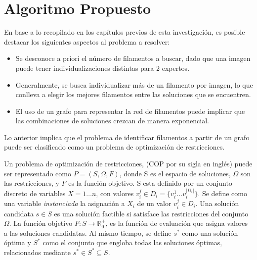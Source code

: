 \chapter{Algoritmo Propuesto}
\label{sec:modeloOpti}

En base a lo recopilado en los cap\'itulos previos de esta investigaci\'on, es posible destacar los siguientes aspectos al problema a resolver:

\begin{itemize}
    \item Se desconoce a priori el n\'umero de filamentos a buscar, dado que una imagen puede tener individualizaciones distintas para 2 expertos.
    \item Generalmente, se busca individualizar m\'as de un filamento por imagen, lo que conlleva a elegir los mejores filamentos entre las soluciones que se encuentren.
    \item El uso de un grafo para representar la red de filamentos puede implicar que las combinaciones de soluciones crezcan de manera exponencial.
\end{itemize}

Lo anterior implica que el problema de identificar filamentos a partir de un grafo puede ser clasificado como un problema de optimizaci\'on de restricciones\cite{blum2011hybrid}.

Un problema de optimización de restricciones, (COP por su sigla en ingl\'es) puede ser representado como $P = (S, \Omega, F)$, donde S es el espacio de soluciones, $\Omega$ son las restricciones, y $F$ es la funci\'on objetivo. S esta definido por un conjunto discreto de variables $X = 1 \dotsc n$, con valores $v_{i}^{j} \in D_{i} = \{v_{i}^{1} \dotsc  v_{i}^{|D_{i}|}\}$. Se define como una variable {\it instanciada} la asignaci\'on a $X_i$ de un valor $v_{i}^{j} \in D_i$. Una solución candidata $s \in S$ es una soluci\'on factible si satisface las restricciones del conjunto $\Omega$. La funci\'on objetivo $F: S\rightarrow \mathbb R_{0}^{+}$, es la funci\'on de evaluaci\'on que asigna valores a las soluciones candidatas. Al mismo tiempo, se define $s^{*}$ como una soluci\'on \'optima y $S^{*}$ como el conjunto que engloba todas las soluciones \'optimas, relacionados mediante $s^{*} \in S^{*} \subseteq S $\cite{socha2008ant}.

